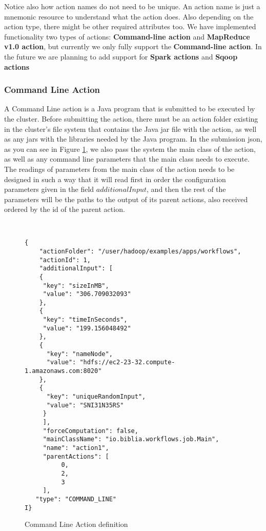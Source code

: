 Notice also how action names do not need to be unique. An action name is just a mnemonic resource to understand what the action does. Also depending on the action type, there might be other required attributes too. We have implemented functionality two types of actions: \textbf{Command-line action} and \textbf{MapReduce v1.0 action}, but currently we only fully support the \textbf{Command-line action}. In the future we are planning to add support for \textbf{Spark actions} and \textbf{Sqoop actions}

\subsubsection{Command Line Action}
A Command Line action is a Java program that is submitted to be executed by the cluster.  Before submitting the action, there must be an action folder existing in the cluster's file system that contains the Java jar file with the action, as well as any jars with the libraries needed by the Java program.  In the submission json, as you can see in Figure \ref{fig:command_line_action_definition}, we also pass the system the main class of the action, as well as any command line parameters that the main class needs to execute.  The readings of parameters from the main class of the action needs to be designed in such a way that it will read first in order the configuration parameters given in the field $additionalInput$, and then the rest of the parameters will be the paths to the output of its parent actions, also received ordered by the id of the parent action.  
\begin{figure}
\begin{mdframed}
\begin{singlespace}
\begin{verbatim}


{
    "actionFolder": "/user/hadoop/examples/apps/workflows", 
    "actionId": 1, 
    "additionalInput": [
    {
     "key": "sizeInMB",
     "value": "306.709032093"
    }, 
    {
     "key": "timeInSeconds", 
     "value": "199.156048492"
    }, 
    {
      "key": "nameNode", 
      "value": "hdfs://ec2-23-32.compute-1.amazonaws.com:8020"
    }, 
    {
      "key": "uniqueRandomInput", 
      "value": "SNI31N35RS"
     }
     ], 
     "forceComputation": false, 
     "mainClassName": "io.biblia.workflows.job.Main", 
     "name": "action1", 
     "parentActions": [
          0, 
          2, 
          3
     ], 
   "type": "COMMAND_LINE"
I}
\end{verbatim}
\end{singlespace}
\end{mdframed}
\caption{Command Line Action definition}
\label{fig:command_line_action_definition}
\end{figure}


